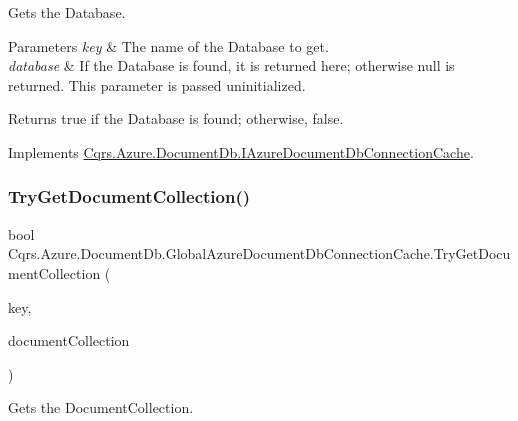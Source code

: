 Gets the Database. 


\begin{DoxyParams}{Parameters}
{\em key} & The name of the Database to get.\\
\hline
{\em database} & If the Database is found, it is returned here; otherwise null is returned. This parameter is passed uninitialized.\\
\hline
\end{DoxyParams}
\begin{DoxyReturn}{Returns}
true if the Database is found; otherwise, false.
\end{DoxyReturn}


Implements \hyperlink{interfaceCqrs_1_1Azure_1_1DocumentDb_1_1IAzureDocumentDbConnectionCache_ac2ab3e4a1c093f10d0b55634d4990ab2_ac2ab3e4a1c093f10d0b55634d4990ab2}{Cqrs.\+Azure.\+Document\+Db.\+I\+Azure\+Document\+Db\+Connection\+Cache}.

\mbox{\label{classCqrs_1_1Azure_1_1DocumentDb_1_1GlobalAzureDocumentDbConnectionCache_a9b178e41d62c9ebcfd8936418d5de009_a9b178e41d62c9ebcfd8936418d5de009}} 
\subsubsection{\texorpdfstring{Try\+Get\+Document\+Collection()}{TryGetDocumentCollection()}}
{\footnotesize\ttfamily bool Cqrs.\+Azure.\+Document\+Db.\+Global\+Azure\+Document\+Db\+Connection\+Cache.\+Try\+Get\+Document\+Collection (\begin{DoxyParamCaption}\item[{string}]{key,  }\item[{out Document\+Collection}]{document\+Collection }\end{DoxyParamCaption})}



Gets the Document\+Collection. 


